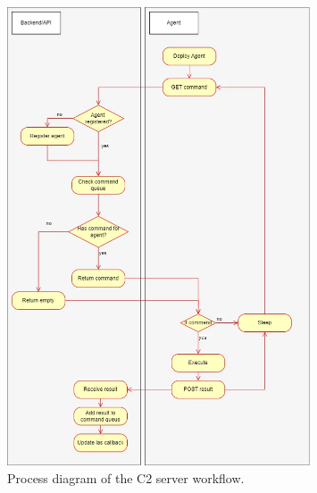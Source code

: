\begin{figure}[h!]
    \centering
    \includegraphics[width=0.8\textwidth]{includegraphics/diagramm.png} %
    \caption{Process diagram of the C2 server workflow.}
    \label{fig:process_diagram}
\end{figure}

